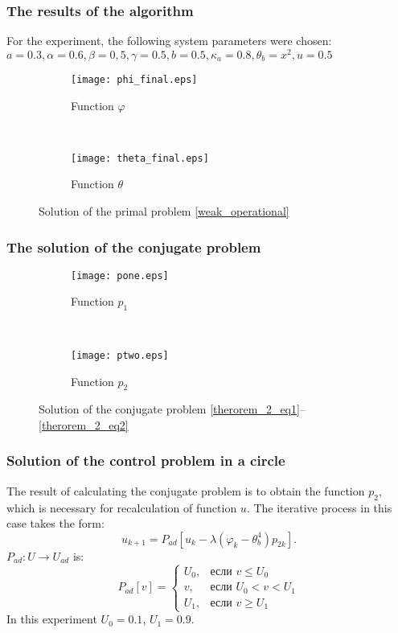 \documentclass[9pt]{beamer}
\begin{document}
\begin{frame}
\frametitle{The results of the algorithm}
    For the experiment, the following system parameters were chosen:
    $ a = 0.3, \alpha = 0.6, \beta = 0,5,\gamma = 0.5, b = 0.5, \kappa_a = 0.8, \theta_b = x^2, u=0.5$
    \begin{figure}
        \begin{subfigure}[b]{0.5\textwidth}
        \texttt{[image: phi\_final.eps]}
        \caption{Function $\varphi$}
        \end{subfigure}%
        ~ %
        \begin{subfigure}[b]{0.5\textwidth}
        \texttt{[image: theta\_final.eps]}
        \caption{Function $\theta$}

        \end{subfigure}
        \caption{Solution of the primal problem \eqref{weak_operational}}
    \end{figure}
\end{frame}

\begin{frame}
\frametitle{The solution of the conjugate problem}

\begin{figure}
    \begin{subfigure}[b]{0.5\textwidth}
    \texttt{[image: pone.eps]}
    \caption{Function $p_1$}
    \end{subfigure}%
    ~ %
    \begin{subfigure}[b]{0.5\textwidth}
    \texttt{[image: ptwo.eps]}
    \caption{Function $p_2$}

    \end{subfigure}
    \caption{Solution of the conjugate problem \eqref{therorem_2_eq1}--\eqref{therorem_2_eq2}}
\end{figure}
\end{frame}

\begin{frame}
    \frametitle{Solution of the control problem in a circle}
    The result of calculating the conjugate problem is to obtain the function $p_2$, which is necessary for recalculation of function $u$. The iterative process in this case takes the form:
    $$u_{k+1} = P_{ad}\left[ u_k - \lambda (\varphi_k - \theta_b^4)p_{2k} \right].$$
    $P_{ad} : U \to U_{ad}$ is:
    \begin{equation}
         P_{ad}[v] =
          \begin{cases}
           U_0,   & \text{если } v \le U_0 \\
           v,     & \text{если } U_0 < v < U_1 \\
           U_1,   & \text{если } v \ge U_1
          \end{cases}
    \end{equation}
    In this experiment $U_0 = 0.1$, $U_1 = 0.9$.

\end{frame}
\end{document}
